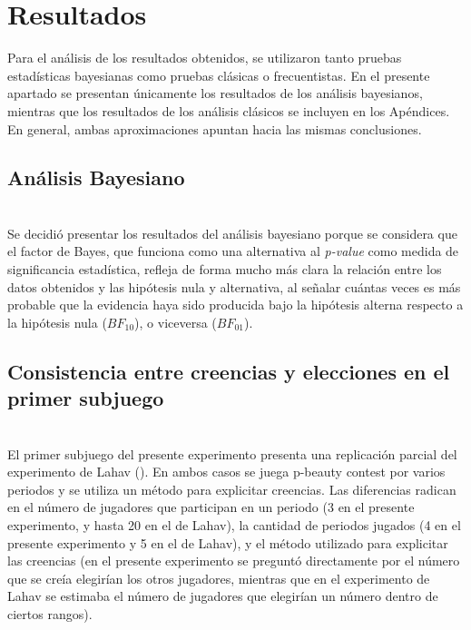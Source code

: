 \chapter{Resultados} %
\label{Cap_Res} %

Para el análisis de los resultados obtenidos, se utilizaron tanto pruebas estadísticas bayesianas como pruebas clásicas o frecuentistas. En el presente apartado se presentan únicamente los resultados de los análisis bayesianos, mientras que los resultados de los análisis clásicos se incluyen en los Apéndices. En general, ambas aproximaciones apuntan hacia las mismas conclusiones.\\

\section{Análisis Bayesiano}\\

Se decidió presentar los resultados del análisis bayesiano porque se considera que el factor de Bayes, que funciona como una alternativa al \textit{p-value} como medida de significancia estadística, refleja de forma mucho más clara la  relación entre los datos obtenidos y las hipótesis nula y alternativa, al señalar cuántas veces es más probable que la evidencia haya sido producida bajo la hipótesis alterna respecto a la hipótesis nula ($BF_10$), o viceversa ($BF_01$).\\

\section{Consistencia entre creencias y elecciones en el primer subjuego}\\

El primer subjuego del presente experimento presenta una replicación parcial del experimento de Lahav (\citeyear{Lahav}). En ambos casos se juega p-beauty contest por varios periodos y se utiliza un método para explicitar creencias. Las diferencias radican en el número de jugadores que participan en un periodo (3 en el presente experimento, y hasta 20 en el de Lahav), la cantidad de periodos jugados (4 en el presente experimento y 5 en el de Lahav), y el método utilizado para explicitar las creencias (en el presente experimento se preguntó directamente por el número que se creía elegirían los otros jugadores, mientras que en el experimento de Lahav se estimaba el número de jugadores que elegirían un número dentro de ciertos rangos).\\

